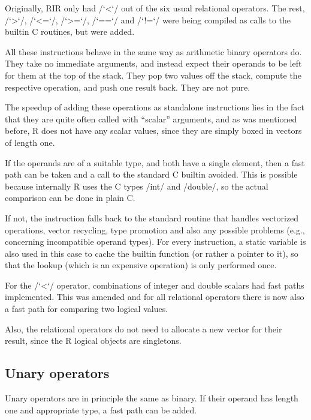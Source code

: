 Originally, RIR only had \rinline/`<`/ out of the six usual relational operators. The rest, \rinline/`>`/, \rinline/`<=`/, \rinline/`>=`/, \rinline/`==`/ and \rinline/`!=`/ were being compiled as calls to the builtin C routines, but were added.

All these instructions behave in the same way as arithmetic binary operators do. They take no immediate arguments, and instead expect their operands to be left for them at the top of the stack. They pop two values off the stack, compute the respective operation, and push one result back. They are not pure\todo[why].

The speedup of adding these operations as standalone instructions lies in the fact that they are quite often called with ``scalar'' arguments, and as was mentioned before, R does not have any scalar values, since they are simply boxed in vectors of length one.

If the operands are of a suitable type, and both have a single element, then a fast path can be taken and a call to the standard C builtin avoided. This is possible because internally R uses the C types \cinline/int/ and \cinline/double/, so the actual comparison can be done in plain C.

If not, the instruction falls back to the standard routine that handles vectorized operations, vector recycling, type promotion and also any possible problems (e.g., concerning incompatible operand types). For every instruction, a static variable is also used in this case to cache the builtin function (or rather a pointer to it), so that the lookup (which is an expensive operation) is only performed once.

For the \rinline/`<`/ operator, combinations of integer and double scalars had fast paths implemented. This was amended and for all relational operators there is now also a fast path for comparing two logical values.

Also, the relational operators do not need to allocate a new vector for their result, since the R logical objects are singletons.


\subsection{Unary operators}

Unary operators are in principle the same as binary. If their operand has length one and appropriate type, a fast path can be added.

